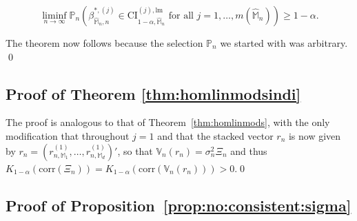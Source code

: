 \documentclass[preprint]{imsart}
\newcommand{\M}{\mathbb M}
\numberwithin{equation}{section}
\begin{document}
\begin{equation}
\liminf_{n \to \infty} \mathbb{P}_n \left(\beta_{\hat{\mathbb{M}}_n, n}^{*, (j)} \in \mathrm{CI}_{1-\alpha, \hat{\mathbb{M}}_n}^{(j), \mathrm{lm}} \text{ for all } j = 1, \hdots, m(\hat{\mathbb{M}}_n)  \right) \geq 1-\alpha.
\end{equation}

The theorem now follows because the selection $\mathbb{P}_n$ we started with was arbitrary. \hfill\qed


\subsection{Proof of Theorem \ref{thm:homlinmodsindi}}
\label{subsection:proof:thm:homlinmodsindi}

The proof is analogous to that of Theorem~\ref{thm:homlinmods}, with the only modification that throughout $j=1$ and that the stacked vector $r_n$ is now given by $r_n = (r_{n,\M_1}^{(1)},\dots, r_{n,\M_d}^{(1)})'$, so that
$\mathbb{V}_n(r_n) = \sigma_n^2 \Xi_n$ and thus $K_{1-\alpha}(\mathrm{corr}(\Xi_n)) = K_{1-\alpha}(\mathrm{corr}(\mathbb{V}_n(r_n))) > 0$.\hfill\qed



\subsection{Proof of Proposition~\ref{prop:no:consistent:sigma}} \label{subsection:proof:no:consistent:sigma}
\end{document}

